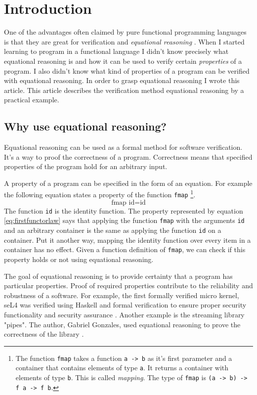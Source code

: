 \section{Introduction}
\label{sec:This}

One of the advantages often claimed by pure functional programming languages is that they are great for \gls{verification} and \emph{equational reasoning} \cite{Wadler87}.
When I started learning to program in a functional language I didn't know precisely what equational reasoning is and how it can be used to verify certain \emph{properties} of a program. I also didn't know what kind of properties of a program can be verified with equational reasoning. In order to grasp equational reasoning I wrote this article.
This article describes the verification method equational reasoning by a practical example. 

\subsection{Why use equational reasoning?}

Equational reasoning can be used as a formal method for software verification. It's a way to proof the correctness of a program. Correctness means that specified properties of the program hold for an arbitrary input. 

A property of a program can be specified in the form of an equation. For example the following equation states a property of the function \verb|fmap|  \footnote{The function \verb|fmap| takes a function \verb|a -> b| as it's first parameter and a container that contains elements of type \verb|a|. It returns a container with elements of type \verb|b|. This is called \emph{mapping}. The type of \verb|fmap| is \verb|(a -> b) -> f a -> f b|.}.
\begin{equation}
  \label{eq:firstfunctorlaw}
\text{fmap } \text{id}  =  \text{id}  
\end{equation}
 The function \verb|id| is the identity function. The property represented by equation \ref{eq:firstfunctorlaw} says that applying the function \verb|fmap| with the arguments \verb|id| and an arbitrary container is the same as applying the function \verb|id| on a container. Put it another way, mapping the identity function over every item in a container has no effect. Given a function definition of \verb|fmap|, we can check if this property holds or not using equational reasoning.

The goal of equational reasoning is to provide certainty that a program has particular properties. Proof of required properties contribute to the reliability and robustness of a software. 
For example, the first formally verified micro kernel, seL4 was verified using Haskell and formal verification to ensure proper security functionality and security assurance \cite{Klein09}.
Another example is the streaming library "pipes". The author, Gabriel Gonzales, used equational reasoning to prove the correctness of the library \cite{gonzales13}.

